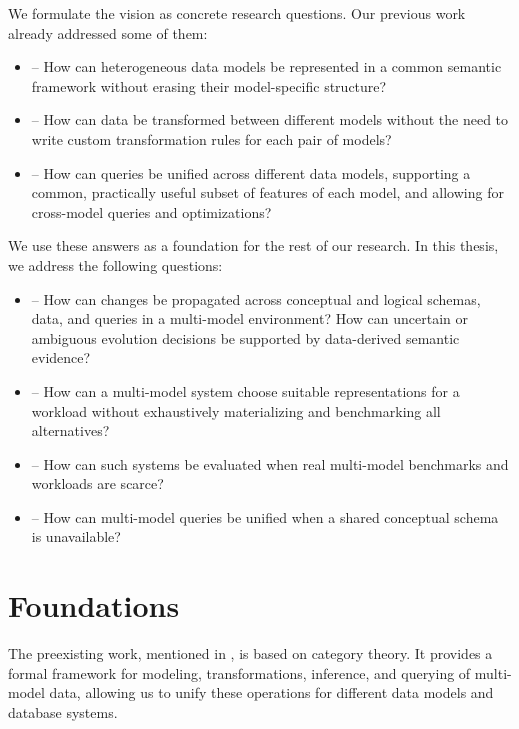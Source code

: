 We formulate the vision as concrete research questions. Our previous work already addressed some of them:
\begin{itemize}
    \item {} -- How can heterogeneous data models be represented in a common semantic framework without erasing their model-specific structure?
    \item {} -- How can data be transformed between different models without the need to write custom transformation rules for each pair of models?
    \item {} -- How can queries be unified across different data models, supporting a common, practically useful subset of features of each model, and allowing for cross-model queries and optimizations?
\end{itemize}
We use these answers as a foundation for the rest of our research. In this thesis, we address the following questions:
\begin{itemize}
    \item {} -- How can changes be propagated across conceptual and logical schemas, data, and queries in a multi-model environment? How can uncertain or ambiguous evolution decisions be supported by data-derived semantic evidence?
    \item {} -- How can a multi-model system choose suitable representations for a workload without exhaustively materializing and benchmarking all alternatives?
    \item {} -- How can such systems be evaluated when real multi-model benchmarks and workloads are scarce?
    \item {} -- How can multi-model queries be unified when a shared conceptual schema is unavailable?
\end{itemize}


\section{Foundations}

The preexisting work, mentioned in , is based on category theory. It provides a formal framework for modeling, transformations, inference, and querying of multi-model data, allowing us to unify these operations for different data models and database systems.

